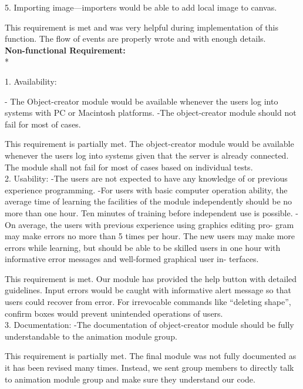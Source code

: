 \documentclass[a4paper, 11pt]{article} %
\begin{document}
5.	Importing image—importers would be able to add local image to canvas.

This requirement is met and was very helpful during implementation of this function. The flow of events are properly wrote and with enough details.
\\

\textbf {Non-functional Requirement:} \\*

1. 	Availability:

- The Object-creator module would be available whenever the users log into systems with PC or Macintosh platforms.
-The object-creator module should not fail for most of cases.

This requirement is partially met. The object-creator module would be available whenever the users log into systems given that the server is already connected. The module shall not fail for most of cases based on individual tests.\\

2.	Usability:
-The users are not expected to have any knowledge of or previous experience programming.
-For users with basic computer operation ability, the average time of learning the facilities of the module independently should be no more than one hour.
Ten minutes of training before independent use is possible.
-On average, the users with previous experience using graphics editing pro-
gram may make errors no more than 5 times per hour. The new users may
make more errors while learning, but should be able to be skilled users in
one hour with informative error messages and well-formed graphical user in-
terfaces.

This requirement is met. Our module has provided the help button with detailed guidelines. Input errors would be caught with informative alert message so that users could recover from error. For irrevocable commands like “deleting shape”, confirm boxes would prevent unintended operations of users.\\

3. 	Documentation:
-The documentation of object-creator module should be fully understandable to the animation module group.

This requirement is partially met. The final module was not fully documented as it has been revised many times. Instead, we sent group members to directly talk to animation module group and make sure they understand our code.\\
\end{document}
